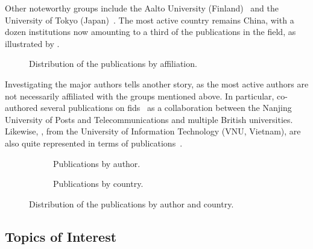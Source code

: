 Other noteworthy groups include the Aalto University (Finland)~\cite{nguyen_FLGUARDSecurePrivate_2021} and the University of Tokyo (Japan)~\cite{sun_AdaptiveFederatedLearning_2020,sun_AdaptiveIntrusionDetection_2021,qin_FederatedLearningBasedNetwork_2021}.
The most active country remains China, with a dozen institutions now amounting to a third of the publications in the field, as illustrated by .


\begin{figure}
  \centering
  
  \caption{
    Distribution of the publications by affiliation.
    \label{fig:sota.affiliations}
  }
\end{figure}

Investigating the major authors tells another story, as the most active authors are not necessarily affiliated with the groups mentioned above.
In particular,  co-authored several publications on \gls{fids}~\cite{popoola_FederatedDeepLearning_2021,popoola_FederatedDeepLearning_2021a,popoola_OptimizingDeepLearning_2022,popoola_FederatedDeepLearning_2023} as a collaboration between the Nanjing University of Posts and Telecommunications and multiple British universities.
Likewise, , from the University of Information Technology (VNU, Vietnam), are also quite represented in terms of publications~\cite{duy_Federatedlearningbasedintrusion_2021,vy_FederatedLearningBasedIntrusion_2021,thi_FederatedLearningBasedCyber_2022,quyen_FederatedIntrusionDetection_2022}.
  
\begin{figure}
  \centering
  \begin{subfigure}{0.48\textwidth}
    \centering
    
    \caption{
      Publications by author.
      \label{fig:sota.authors}
    }
  \end{subfigure}
  \hfill
  \begin{subfigure}{0.48\textwidth}
    \centering
    
    \caption{
      Publications by country.
      \label{fig:sota.countries}
    }
  \end{subfigure}
  \caption{
    Distribution of the publications by author and country.
    \label{fig:sota.authors-countries}
  }
\end{figure}


\subsection{Topics of Interest\label{sec:sota.quanti.topics}}

